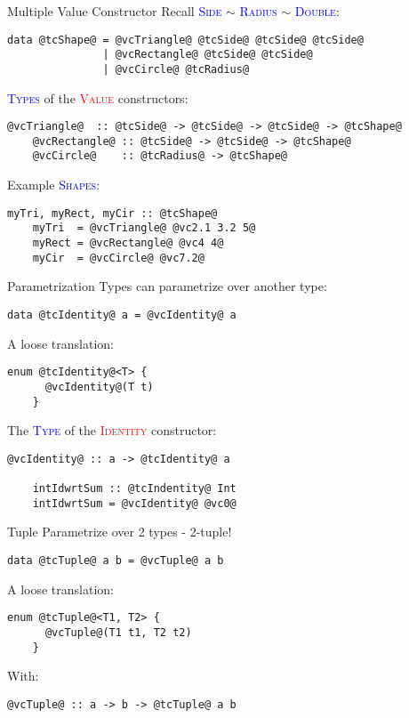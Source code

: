\documentclass[xcolor={usenames,dvipsnames}]{beamer}
\newcommand{\htycon}[1]{\textcolor{Blue}{\textsc{#1}}}
\newcommand{\hvalcon}[1]{\textcolor{Red}{\textsc{#1}}}
\begin{document}
\begin{frame}[fragile]{Multiple Value Constructor}
  Recall \htycon{Side} $\sim$ \htycon{Radius} $\sim$ \htycon{Double}:
  \begin{lstlisting}[style=hask]
    data @tcShape@ = @vcTriangle@ @tcSide@ @tcSide@ @tcSide@
               | @vcRectangle@ @tcSide@ @tcSide@
               | @vcCircle@ @tcRadius@
  \end{lstlisting}

  \pause
  \htycon{Types} of the \hvalcon{Value} constructors:
  \begin{lstlisting}[style=hask]
    @vcTriangle@  :: @tcSide@ -> @tcSide@ -> @tcSide@ -> @tcShape@
    @vcRectangle@ :: @tcSide@ -> @tcSide@ -> @tcShape@
    @vcCircle@    :: @tcRadius@ -> @tcShape@
  \end{lstlisting}

  \pause
  Example \htycon{Shapes}:
  \begin{lstlisting}[style=hask]
    myTri, myRect, myCir :: @tcShape@
    myTri  = @vcTriangle@ @vc2.1 3.2 5@
    myRect = @vcRectangle@ @vc4 4@
    myCir  = @vcCircle@ @vc7.2@
  \end{lstlisting}
\end{frame}

\begin{frame}[fragile]{Parametrization}
  Types can parametrize over another type:
  \begin{lstlisting}[style=hask]
    data @tcIdentity@ a = @vcIdentity@ a
  \end{lstlisting}

  \pause
  A loose translation:
  \begin{lstlisting}[style=hask]
    enum @tcIdentity@<T> {
      @vcIdentity@(T t)
    }
  \end{lstlisting}

  \pause
  The \htycon{Type} of the \hvalcon{Identity} constructor:
  \begin{lstlisting}[style=hask]
    @vcIdentity@ :: a -> @tcIdentity@ a

    intIdwrtSum :: @tcIndentity@ Int
    intIdwrtSum = @vcIdentity@ @vc0@
  \end{lstlisting}
\end{frame}

\begin{frame}[fragile]{Tuple}
  Parametrize over 2 types - 2-tuple!
  \begin{lstlisting}[style=hask]
    data @tcTuple@ a b = @vcTuple@ a b
  \end{lstlisting}

  \pause
  A loose translation:
  \begin{lstlisting}[style=hask]
    enum @tcTuple@<T1, T2> {
      @vcTuple@(T1 t1, T2 t2)
    }
  \end{lstlisting}

  \pause
  With:
  \begin{lstlisting}[style=hask]
    @vcTuple@ :: a -> b -> @tcTuple@ a b
  \end{lstlisting}
\end{frame}
\end{document}
